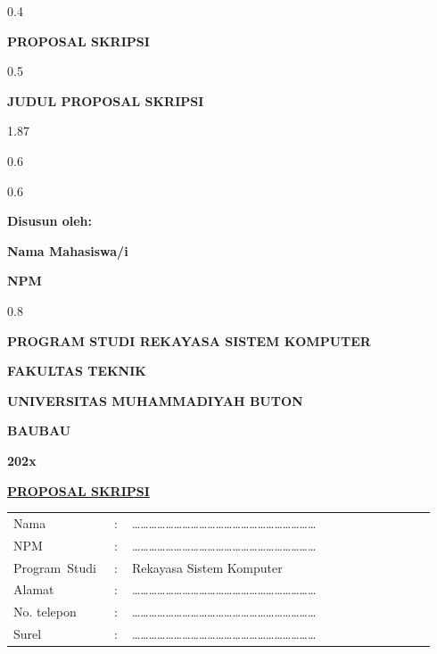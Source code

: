\thispagestyle{empty}
\begin{ruang}{0.4}\end{ruang}
\begin{sampulbesar}
\textbf{PROPOSAL SKRIPSI}
\end{sampulbesar}
\begin{ruang}{0.5}\end{ruang}
\begin{sampulbesar}
\textbf{JUDUL PROPOSAL SKRIPSI}
\end{sampulbesar}
\begin{ruang}{1.87}\end{ruang}
\begin{ruang}{0.6}\end{ruang}
\begin{tengah}
\logo{4.5cm}
\end{tengah}
\begin{ruang}{0.6}\end{ruang}
\begin{sampulsedang}
\textbf{Disusun oleh:}

\textbf{Nama Mahasiswa/i}

\textbf{NPM}
\end{sampulsedang}
\begin{ruang}{0.8}\end{ruang}
\begin{sampulsedang}
\textbf{PROGRAM STUDI REKAYASA SISTEM KOMPUTER}

\textbf{FAKULTAS TEKNIK}

\textbf{UNIVERSITAS MUHAMMADIYAH BUTON}

\textbf{BAUBAU}

\textbf{202x}
\end{sampulsedang}
\begin{halamanbaru}\end{halamanbaru}

\thispagestyle{empty}
\begin{tengah}
\textbf{\underline{PROPOSAL SKRIPSI}}
\end{tengah}

\begin{tanpagaris}
\begin{longtable}{@{}p{0.22\linewidth}p{0.04\linewidth}p{0.68\linewidth}@{}}
Nama & : & ………………………………………………………… \\[6pt]
NPM & : & ………………………………………………………… \\[6pt]
\mbox{Program Studi} & : & Rekayasa Sistem Komputer \\[6pt]
Alamat & : & ………………………………………………………… \\[6pt]
No. telepon & : & ………………………………………………………… \\[6pt]
Surel & : & ………………………………………………………… \\
\end{longtable}
\end{tanpagaris}

